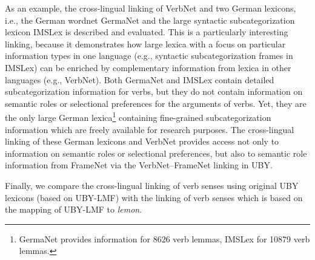 As an example, the cross-lingual linking of VerbNet and two German lexicons, i.e., the German wordnet GermaNet \cite{Kunze02} and the large syntactic subcategorization lexicon
IMSLex \cite{TUD-CS999-0006} is described and evaluated.
This is a particularly interesting linking, because it demonstrates how large lexica with a focus on particular information types in one language 
(e.g., syntactic subcategorization frames in IMSLex) can be enriched by complementary information from lexica in other languages (e.g., VerbNet). Both GermaNet and IMSLex contain detailed subcategorization information
for verbs, but they do not contain information on semantic roles
or selectional preferences for the arguments of verbs. Yet, they are the only large
German lexica\footnote{GermaNet provides information for 8626 verb lemmas, IMSLex for 10879 verb lemmas.} containing fine-grained subcategorization information which are freely available for research purposes.
The cross-lingual linking
of these German lexicons and VerbNet provides access not only to information on semantic roles
or selectional preferences, but also to semantic role information from FrameNet via the VerbNet--FrameNet
linking in UBY.

Finally, we compare the cross-lingual linking of verb senses using
 original UBY lexicons (based on UBY-LMF) with the linking of verb senses which is based on the
mapping of UBY-LMF to \emph{lemon}.



 
